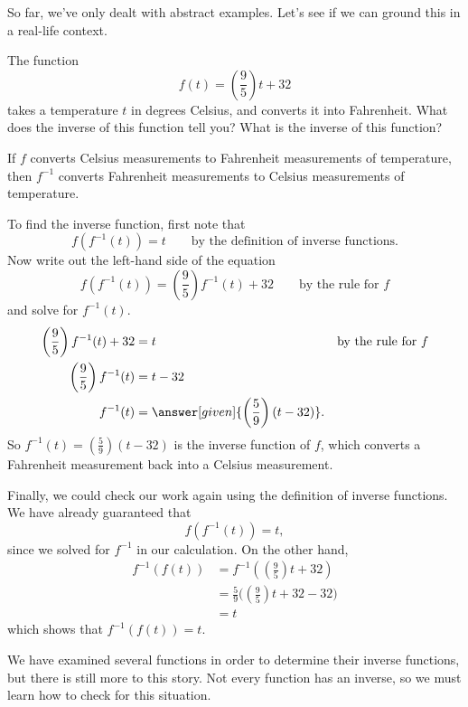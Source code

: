 \documentclass{ximera}
\begin{document}
So far, we've only dealt with abstract examples.  Let's see
if we can ground this in a real-life context.

\begin{example}
  The function
  \[
  f(t) = \left(\frac{9}{5}\right) t + 32
  \]	
  takes a temperature $t$ in degrees Celsius, and converts it into Fahrenheit.  
  What does the inverse 
  of this function tell you? What is the inverse of this function?

  \begin{explanation}
    If $f$ converts Celsius measurements to Fahrenheit measurements of
    temperature, then $f^{-1}$ converts Fahrenheit measurements to
    Celsius measurements of temperature.
    
    To find the inverse function, first note that 
    \[
    f(f^{-1}(t)) = t \qquad \text{by the definition of inverse
      functions.}
    \]
    Now write out the left-hand side of the equation
    \[
    f(f^{-1}(t)) = \left(\frac{9}{5}\right) f^{-1}(t)+32\qquad\text{by the rule for $f$}
    \]
    and solve for $f^{-1}(t)$.
    \begin{align*}
      \left(\frac{9}{5}\right) f^{-1}(t)+32 &= t &&\text{by the rule for $f$}\\
      \left(\frac{9}{5}\right) f^{-1}(t)&= t -32\\
      f^{-1}(t) &= \answer[given]{\left(\frac{5}{9}\right)(t - 32)}.
    \end{align*}
    So $f^{-1}(t) = \left(\frac{5}{9}\right)(t - 32)$ is the inverse
    function of $f$, which converts a Fahrenheit measurement back into
    a Celsius measurement.  
    
    Finally, we could check our work again using the definition of inverse functions.
     We have already guaranteed that
    \[
    f(f^{-1}(t)) = t,
    \]
    since we solved for $f^{-1}$ in our calculation.  On the other hand, 
      \begin{align*}
     f^{-1}(f(t))&=f^{-1} \left(\left(\frac{9}{5}\right)t+32\right) \\
     &= \frac{5}{9}\Big( \left(\frac{9}{5}\right)t+32-32\Big)\\
     &=t
       \end{align*}
which shows that $f^{-1}(f(t)) = t$.
  \end{explanation}
\end{example}



We have examined several functions in order to determine their inverse
functions, but there is still more to this story.  Not every function
has an inverse, so we must learn how to check for this
situation.
\end{document}
